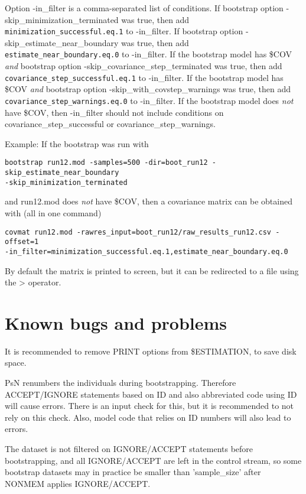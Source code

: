 Option -in\_filter is a comma-separated list of conditions.
If bootstrap option -skip\_minimization\_terminated was true, then add 
\verb|minimization_successful.eq.1|
to -in\_filter. 
If bootstrap option -skip\_estimate\_near\_boundary was true, then add 
\verb|estimate_near_boundary.eq.0| 
to -in\_filter. 
If the bootstrap model has \$COV \emph{and} bootstrap option -skip\_covariance\_step\_terminated was true, then add
\verb|covariance_step_successful.eq.1| 
to -in\_filter. 
If the bootstrap model has \$COV \emph{and} bootstrap option -skip\_with\_covstep\_warnings was true, then add
\verb|covariance_step_warnings.eq.0| 
to -in\_filter. 
If the bootstrap model does \emph{not} have \$COV, then -in\_filter should not include conditions on covariance\_step\_successful or
covariance\_step\_warnings.

Example: If the bootstrap was run with
\begin{verbatim}
bootstrap run12.mod -samples=500 -dir=boot_run12 -skip_estimate_near_boundary 
-skip_minimization_terminated
\end{verbatim}
and run12.mod does \emph{not} have \$COV, then a covariance matrix can be obtained with (all in one command)

\begin{verbatim}
covmat run12.mod -rawres_input=boot_run12/raw_results_run12.csv -offset=1 
-in_filter=minimization_successful.eq.1,estimate_near_boundary.eq.0
\end{verbatim}

By default the matrix is printed to screen, but it can be redirected to a file using the > operator.


\section{Known bugs and problems}

It is recommended to remove PRINT options from \$ESTIMATION, to save disk space.

PsN renumbers the individuals during bootstrapping. Therefore ACCEPT/IGNORE statements based on ID and also abbreviated code using ID will cause errors. 
There is an input check for this, but it is recommended to not rely on this check. Also, model code that relies on ID numbers will also lead to
errors.

The dataset is not filtered on IGNORE/ACCEPT statements before bootstrapping,
and all IGNORE/ACCEPT are left in the control stream, so some bootstrap
datasets may in practice be smaller than 'sample\_size' after NONMEM applies
IGNORE/ACCEPT. 

